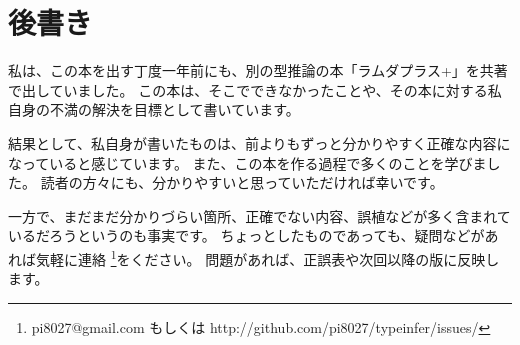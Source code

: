 
\chapter{後書き}

私は、この本を出す丁度一年前にも、別の型推論の本「ラムダプラス+」を共著で出していました。
この本は、そこでできなかったことや、その本に対する私自身の不満の解決を目標として書いています。

結果として、私自身が書いたものは、前よりもずっと分かりやすく正確な内容になっていると感じています。
また、この本を作る過程で多くのことを学びました。
読者の方々にも、分かりやすいと思っていただければ幸いです。

一方で、まだまだ分かりづらい箇所、正確でない内容、誤植などが多く含まれているだろうというのも事実です。
ちょっとしたものであっても、疑問などがあれば気軽に連絡
\footnote{pi8027@gmail.com もしくは http://github.com/pi8027/typeinfer/issues/}をください。
問題があれば、正誤表や次回以降の版に反映します。
